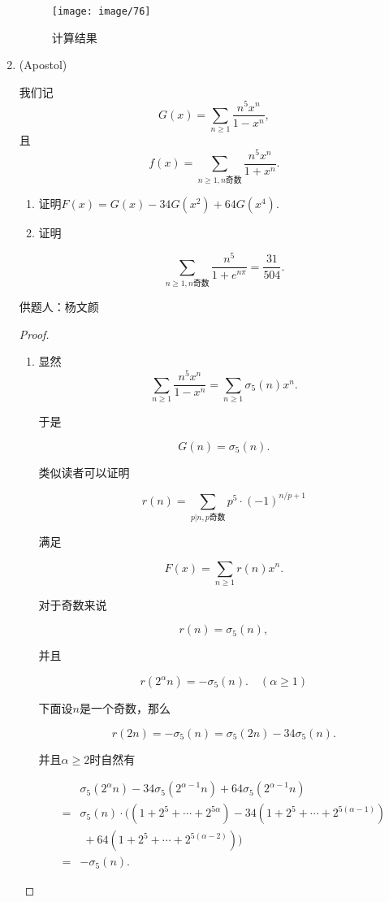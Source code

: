 \documentclass[lang=cn,12pt,a4paper]{elegantpaper}
\begin{document}
\begin{enumerate}
	\begin{figure}[ht]
		\centering
		\texttt{[image: image/76]}
		\caption{计算结果}
	\end{figure}


	\item(Apostol)

	我们记
	\[G(x)=\sum_{n\geq 1} \dfrac{n^5x^n}{1-x^n},\]
	且
	\[f(x)=\sum_{n\geq 1, n \textbf{奇数}}\dfrac{n^5x^n}{1+x^n}.\]

	\begin{enumerate}
		\item 证明$F(x) = G(x)-34G(x^2)+64G(x^4).$

		\item 证明

		\[ \sum_{n\geq 1, n \textbf{奇数}} \dfrac{n^5}{1+e^{n\pi}} = \frac{31}{504}.\]
	\end{enumerate}
	\begin{flushright}
		\kaishu
		供题人：杨文颜
	\end{flushright}

	\begin{proof}
		\begin{enumerate}
			\item
			显然
			\[ \sum_{n \geq 1} \dfrac{n^5x^n}{1-x^n} = \sum_{n \geq 1}\sigma_{5}(n)x^n.\]

			于是

			\[ G(n) = \sigma_{5}(n).\]

			类似读者可以证明

			\[ r(n)=\sum_{p|n, p \textbf{奇数}}p^5 \cdot (-1)^{n/p+1}\]

			满足

			\[ F(x) = \sum_{n \geq 1}r(n)x^n.\]

			对于奇数来说

			\[ r(n)=\sigma_{5}(n),\]

			并且

			\[ r(2^{\alpha}n)= - \sigma_{5}(n). \quad (\alpha \geq 1)\]

			下面设$n$是一个奇数，那么

			\[ r(2n)= -\sigma_{5}(n) = \sigma_{5}(2n)-34\sigma_{5}(n).\]

			并且$\alpha \geq 2$时自然有

			\begin{align*}
				&\sigma_{5}(2^{\alpha}n)-34\sigma_{5}(2^{\alpha-1}n)+64\sigma_{5}(2^{\alpha-1}n) \\
				=&\sigma_{5}(n) \cdot ((1+2^5+\cdots+2^{5\alpha})-34(1+2^5+\cdots+2^{5(\alpha-1)}) \\
				&\;+64(1+2^5+\cdots+2^{5(\alpha-2)})) \\
				=&-\sigma_{5}(n).
			\end{align*}


\end{enumerate}
\end{proof}
\end{enumerate}
\end{document}
